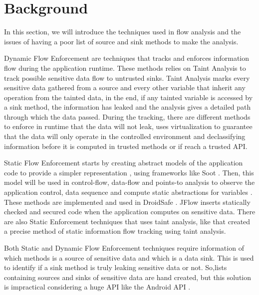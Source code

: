 \chapter{Background}\label{background}

In this section, we will introduce the techniques used in flow analysis and the issues of having a poor list of source and sink methods to make the analysis.

Dynamic Flow Enforcement are techniques that tracks and enforces information flow during the application runtime. These methods relies on Taint Analysis to track possible sensitive data flow to untrusted sinks. Taint Analysis marks every sensitive data gathered from a source and every other variable that inherit any operation from the tainted data, in the end, if any tainted variable is accessed by a sink method, the information has leaked and the analysis gives a detailed path through which the data passed. During the tracking, there are different methods to enforce in runtime that the data will not leak, \cite{fernandes2016flowfence} uses virtualization to guarantee that the data will only operate in the controlled environment and \cite{sun2017data} declassifying information before it is computed in trusted methods or if reach a trusted API.

Static Flow Enforcement starts by creating abstract models of the application code to provide a simpler representation \citep{myers1999jflow}, using frameworks like Soot \citep{vallee2000optimizing}. Then, this model will be used in control-flow, data-flow and points-to analysis to observe the application control, data sequence and compute static abstractions for variables \cite{li2017static}. These methods are implemented and used in DroidSafe \cite{gordon2015information}. JFlow \cite{myers1999jflow} inserts statically checked and secured code when the application computes on sensitive data. There are also Static Enforcement techniques that uses taint analysis, like \cite{arzt2014flowdroid} that created a precise method of static information flow tracking using taint analysis.

Both Static and Dynamic Flow Enforcement techniques require information of which methods is a source of sensitive data and which is a data sink. This is used to identify if a sink method is truly leaking sensitive data or not. So,lists containing sources and sinks of sensitive data are hand created, but this solution is impractical considering a huge API like the Android API \cite{rasthofer2014machine}.

